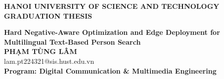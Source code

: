 \documentclass[Main.tex]{subfiles}
\begin{document}
\begin{titlepage}
\thispagestyle{empty}
\begin{center}

{\textbf{\large{HANOI UNIVERSITY OF SCIENCE AND TECHNOLOGY }}}\\[4cm]

{\textbf{\huge{GRADUATION THESIS}}}\\[1cm]
{\textbf{\Large{Hard Negative-Aware Optimization and Edge Deployment for Multilingual Text-Based Person Search}}\\[1cm]

{\textbf{\large{PHẠM TÙNG LÂM}}}\\
{\large{lam.pt224321@sis.hust.edu.vn}}\\[0.5cm]

{\textbf{\large{Program: Digital Communication \& Multimedia Engineering}}}\\

\vspace{4cm}
\begin{table}[H]
\centering
{}
\end{table}}
\end{center}



\end{titlepage}
\end{document}
